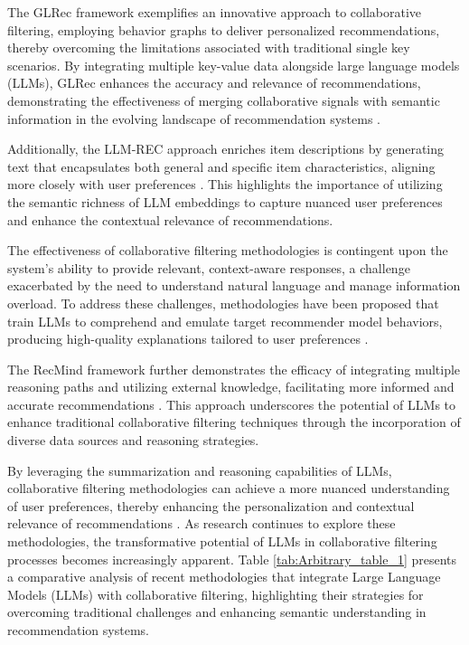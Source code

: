The GLRec framework exemplifies an innovative approach to collaborative filtering, employing behavior graphs to deliver personalized recommendations, thereby overcoming the limitations associated with traditional single key scenarios. By integrating multiple key-value data alongside large language models (LLMs), GLRec enhances the accuracy and relevance of recommendations, demonstrating the effectiveness of merging collaborative signals with semantic information in the evolving landscape of recommendation systems \cite{wang2023multiple}.

Additionally, the LLM-REC approach enriches item descriptions by generating text that encapsulates both general and specific item characteristics, aligning more closely with user preferences \cite{lyu2023llm}. This highlights the importance of utilizing the semantic richness of LLM embeddings to capture nuanced user preferences and enhance the contextual relevance of recommendations.

The effectiveness of collaborative filtering methodologies is contingent upon the system's ability to provide relevant, context-aware responses, a challenge exacerbated by the need to understand natural language and manage information overload. To address these challenges, methodologies have been proposed that train LLMs to comprehend and emulate target recommender model behaviors, producing high-quality explanations tailored to user preferences \cite{lei2023recexplainer}.

The RecMind framework further demonstrates the efficacy of integrating multiple reasoning paths and utilizing external knowledge, facilitating more informed and accurate recommendations \cite{wang2023recmind}. This approach underscores the potential of LLMs to enhance traditional collaborative filtering techniques through the incorporation of diverse data sources and reasoning strategies.

By leveraging the summarization and reasoning capabilities of LLMs, collaborative filtering methodologies can achieve a more nuanced understanding of user preferences, thereby enhancing the personalization and contextual relevance of recommendations \cite{tian2024mmrecllmbasedmultimodal}. As research continues to explore these methodologies, the transformative potential of LLMs in collaborative filtering processes becomes increasingly apparent. Table \ref{tab:Arbitrary_table_1} presents a comparative analysis of recent methodologies that integrate Large Language Models (LLMs) with collaborative filtering, highlighting their strategies for overcoming traditional challenges and enhancing semantic understanding in recommendation systems.




